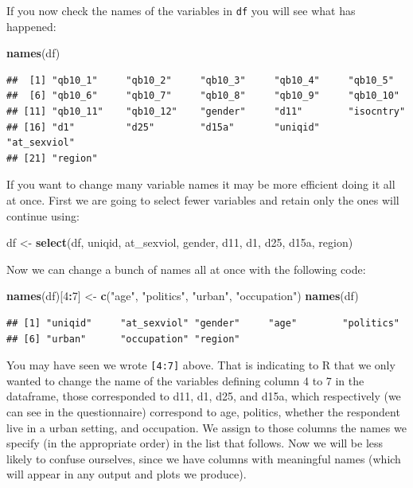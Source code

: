 \documentclass[]{book}
\newenvironment{Shaded}{\begin{snugshade}}{\end{snugshade}}
\newcommand{\DecValTok}[1]{\textcolor[rgb]{0.00,0.00,0.81}{#1}}
\newcommand{\KeywordTok}[1]{\textcolor[rgb]{0.13,0.29,0.53}{\textbf{#1}}}
\newcommand{\NormalTok}[1]{#1}
\newcommand{\OperatorTok}[1]{\textcolor[rgb]{0.81,0.36,0.00}{\textbf{#1}}}
\newcommand{\StringTok}[1]{\textcolor[rgb]{0.31,0.60,0.02}{#1}}
\theoremstyle{definition}
\theoremstyle{definition}
\theoremstyle{definition}
\theoremstyle{remark}
\begin{document}
If you now check the names of the variables in \texttt{df} you will see
what has happened:

\begin{Shaded}
\begin{Highlighting}[]
\KeywordTok{names}\NormalTok{(df)}
\end{Highlighting}
\end{Shaded}

\begin{verbatim}
##  [1] "qb10_1"     "qb10_2"     "qb10_3"     "qb10_4"     "qb10_5"    
##  [6] "qb10_6"     "qb10_7"     "qb10_8"     "qb10_9"     "qb10_10"   
## [11] "qb10_11"    "qb10_12"    "gender"     "d11"        "isocntry"  
## [16] "d1"         "d25"        "d15a"       "uniqid"     "at_sexviol"
## [21] "region"
\end{verbatim}

If you want to change many variable names it may be more efficient doing
it all at once. First we are going to select fewer variables and retain
only the ones will continue using:

\begin{Shaded}
\begin{Highlighting}[]
\NormalTok{df <-}\StringTok{ }\KeywordTok{select}\NormalTok{(df, uniqid, at_sexviol, gender, d11, d1, d25, d15a, region)}
\end{Highlighting}
\end{Shaded}

Now we can change a bunch of names all at once with the following code:

\begin{Shaded}
\begin{Highlighting}[]
\KeywordTok{names}\NormalTok{(df)[}\DecValTok{4}\OperatorTok{:}\DecValTok{7}\NormalTok{] <-}\StringTok{ }\KeywordTok{c}\NormalTok{(}\StringTok{"age"}\NormalTok{, }\StringTok{"politics"}\NormalTok{, }\StringTok{"urban"}\NormalTok{, }\StringTok{"occupation"}\NormalTok{)}
\KeywordTok{names}\NormalTok{(df)}
\end{Highlighting}
\end{Shaded}

\begin{verbatim}
## [1] "uniqid"     "at_sexviol" "gender"     "age"        "politics"  
## [6] "urban"      "occupation" "region"
\end{verbatim}

You may have seen we wrote \texttt{{[}4:7{]}} above. That is indicating
to R that we only wanted to change the name of the variables defining
column 4 to 7 in the dataframe, those corresponded to d11, d1, d25, and
d15a, which respectively (we can see in the questionnaire) correspond to
age, politics, whether the respondent live in a urban setting, and
occupation. We assign to those columns the names we specify (in the
appropriate order) in the list that follows. Now we will be less likely
to confuse ourselves, since we have columns with meaningful names (which
will appear in any output and plots we produce).
\end{document}
